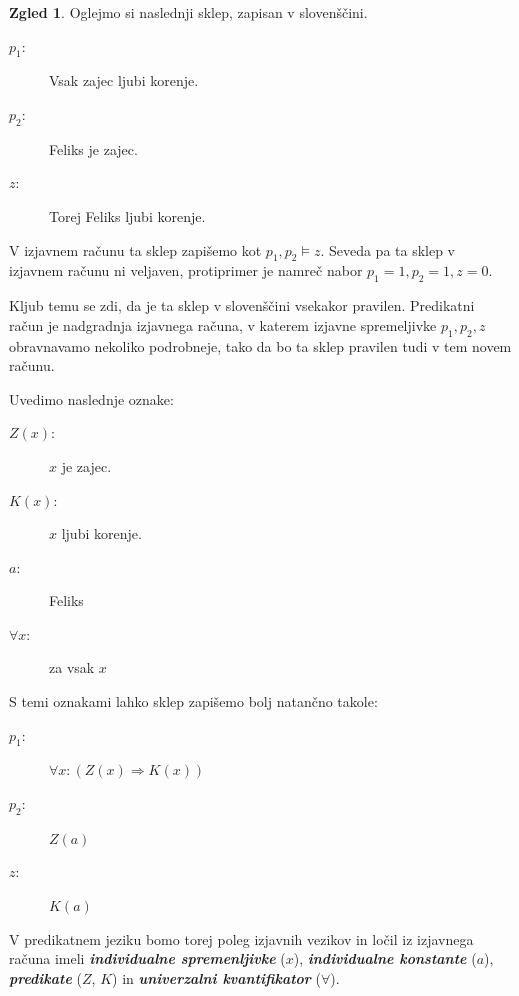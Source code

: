\documentclass[11pt]{book}
\def\definicija{\color{rdeca}\bf\em}
\theoremstyle{definition}
\theoremstyle{zgled}
\newtheorem*{zgled}{Zgled}
\theoremstyle{odprtproblem}
\theoremstyle{domacanaloga}
\theoremstyle{izrek}
\begin{document}
\begin{zgled}
Oglejmo si naslednji sklep, zapisan v slovenščini.

\begin{description}
    \item[$p_1$:] Vsak zajec ljubi korenje.
    \item[$p_2$:] Feliks je zajec.
    \item[$z$:] Torej Feliks ljubi korenje.
\end{description}

V izjavnem računu ta sklep zapišemo kot $p_1, p_2 \models z$. Seveda pa ta sklep v izjavnem računu ni veljaven, protiprimer je namreč nabor $p_1 = 1, p_2 = 1, z = 0$. 

Kljub temu se zdi, da je ta sklep v slovenščini vsekakor pravilen. Predikatni račun je nadgradnja izjavnega računa, v katerem izjavne spremeljivke $p_1, p_2, z$ obravnavamo nekoliko podrobneje, tako da bo ta sklep pravilen tudi v tem novem računu.

Uvedimo naslednje oznake:

\begin{description}
    \item[$Z(x)$:] $x$ je zajec.
    \item[$K(x)$:] $x$ ljubi korenje.
    \item[$a$:] Feliks
    \item[$\forall x$:] za vsak $x$
\end{description}

S temi oznakami lahko sklep zapišemo bolj natančno takole:

\begin{description}
    \item[$p_1$:] $\forall x \colon (Z(x) \Rightarrow K(x))$
    \item[$p_2$:] $Z(a)$
    \item[$z$:] $K(a)$
\end{description}

V predikatnem jeziku bomo torej poleg izjavnih vezikov in ločil iz izjavnega računa imeli {\definicija individualne spremenljivke} ($x$), {\definicija individualne konstante} ($a$), {\definicija predikate} ($Z$, $K$) in {\definicija univerzalni kvantifikator} ($\forall$).
\end{zgled}
\end{document}
